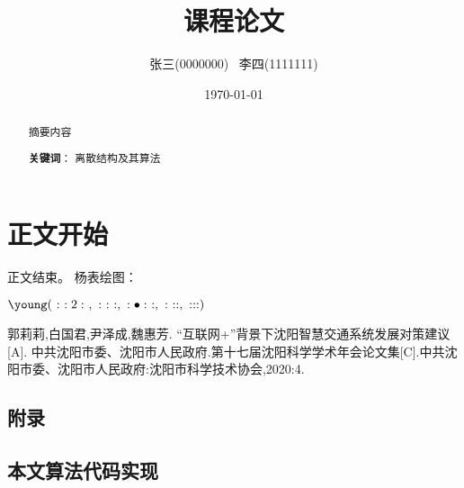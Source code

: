 \documentclass[UTF8]{article}
\title{课程论文}
\author{张三(0000000) \ 李四(1111111)}
\date{\today}
\begin{document}


\maketitle

\begin{abstract}
    摘要内容

    \textbf{关键词}： 离散结构及其算法
\end{abstract}

\section{正文开始}
正文结束。
杨表绘图：

\begin{center}
    \(
    \young(~:~:2:~,~:~:~:,~:\bullet:~:,~:~::,~:::)
    \)
\end{center}



\begin{thebibliography}{99}

    郭莉莉,白国君,尹泽成,魏惠芳. “互联网+”背景下沈阳智慧交通系统发展对策建议[A]. 中共沈阳市委、沈阳市人民政府.第十七届沈阳科学学术年会论文集[C].中共沈阳市委、沈阳市人民政府:沈阳市科学技术协会,2020:4.
\end{thebibliography}


\clearpage
\begin{appendices}
    \section*{附录}
    \subsection*{本文算法代码实现}

    



\end{appendices}
\end{document}
